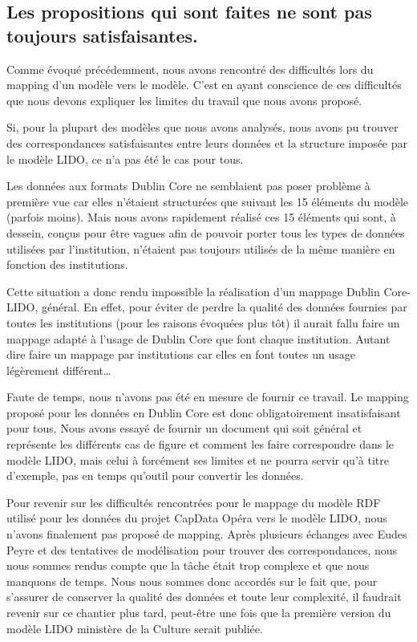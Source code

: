 \subsection{Les propositions qui sont faites ne sont pas toujours satisfaisantes.}


Comme évoqué précédemment, nous avons rencontré des difficultés lors du mapping d'un modèle vers le modèle. C'est en ayant conscience de ces difficultés que nous devons expliquer les limites du travail que nous avons proposé. \newline

Si, pour la plupart des modèles que nous avons analysés, nous avons pu trouver des correspondances satisfaisantes entre leurs données et la structure imposée par le modèle LIDO, ce n'a pas été le cas pour tous. \newline

Les données aux formats Dublin Core ne semblaient pas poser problème à première vue car elles n'étaient structurées que suivant les 15 éléments du modèle (parfois moins). Mais nous avons rapidement réalisé ces 15 éléments qui sont, à dessein, conçus pour être vagues afin de pouvoir porter tous les types de données utilisées par l'institution, n'étaient pas toujours utilisés de la même manière en fonction des institutions. \newline

Cette situation a donc rendu impossible la réalisation d'un mappage Dublin Core-LIDO, général. En effet, pour éviter de perdre la qualité des données fournies par toutes les institutions (pour les raisons évoquées plus tôt) il aurait fallu faire un mappage adapté à l'usage de Dublin Core que font chaque institution. Autant dire faire un mappage par institutions car elles en font toutes un usage légèrement différent… \newline

Faute de temps, nous n'avons pas été en mesure de fournir ce travail. Le mapping proposé pour les données en Dublin Core est donc obligatoirement insatisfaisant pour tous. Nous avons essayé de fournir un document qui soit général et représente les différents cas de figure et comment les faire correspondre dans le modèle LIDO, mais celui à forcément ses limites et ne pourra servir qu'à titre d'exemple, pas en temps qu’outil pour convertir les données.\newline

Pour revenir sur les difficultés rencontrées pour le mappage du modèle RDF utilisé pour les données du projet CapData Opéra vers le modèle LIDO, nous n'avons finalement pas proposé de mapping. Après plusieurs échanges avec Eudes Peyre et des tentatives de modélisation pour trouver des correspondances, nous nous sommes rendus compte que la tâche était trop complexe et que nous manquons de temps. Nous nous sommes donc accordés sur le fait que, pour s'assurer de conserver la qualité des données et toute leur complexité, il faudrait revenir sur ce chantier plus tard, peut-être une fois que la première version du modèle LIDO ministère de la Culture serait publiée. \newline

